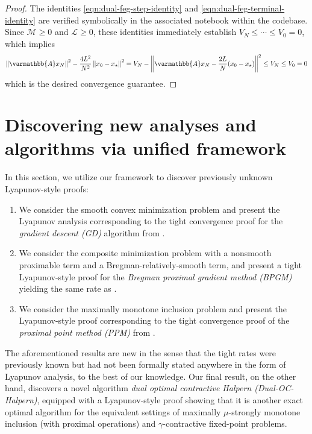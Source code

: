 \documentclass{article}
\theoremstyle{definition}
\theoremstyle{plain}
\newcommand{\cL}{{\mathcal{L}}}
\newcommand{\cM}{{\mathcal{M}}}
\newcommand{\opA}{{\varmathbb{A}}}
\newcommand{\sqnorm}[1]{\left\| #1 \right\|^2}
\begin{document}
\begin{proof}
The identities \eqref{eqn:dual-feg-step-identity} and \eqref{eqn:dual-feg-terminal-identity} are verified symbolically in the associated notebook  within the codebase.
Since $\cM\ge0$ and $\cL\ge0$, these identities immediately establish $V_N\le\cdots\le V_0=0$, which implies
\begin{align*}
    \sqnorm{\opA x_N}
    -\frac{4L^2}{N^2}\sqnorm{x_0-x_\star}
    =
    V_N-\sqnorm{\opA x_N-\frac{2L}{N}(x_0-x_\star)} 
    \le V_N \le V_0 = 0 
\end{align*}
which is the desired convergence guarantee.
\end{proof}




\section{Discovering new analyses and algorithms via unified framework}
\label{section:new-lyapunov}

In this section, we utilize our framework to discover previously unknown Lyapunov-style proofs:
\begin{enumerate}
    \item We consider the smooth convex minimization problem and present the Lyapunov analysis corresponding to the tight convergence proof for the \emph{gradient descent (GD)} algorithm from \cite{DroriTeboulle2014_performance}.
    
    \item We consider the composite minimization problem with a nonsmooth proximable term and a Bregman-relatively-smooth term, and present a tight Lyapunov-style proof for the \emph{Bregman proximal gradient method (BPGM)} yielding the same rate as \cite{ZhouLiangShen2019_simple, GutmanPena2023_perturbed}.
    
    \item We consider the maximally monotone inclusion problem and present the Lyapunov-style proof corresponding to the tight convergence proof of the \emph{proximal point method (PPM)} from \cite{guTightSublinearConvergence2020}.
\end{enumerate}
The aforementioned results are new in the sense that the tight rates were previously known but had not been formally stated anywhere in the form of Lyapunov analysis, to the best of our knowledge.
Our final result, on the other hand, discovers a novel algorithm \emph{dual optimal contractive Halpern (Dual-OC-Halpern)}, equipped with a Lyapunov-style proof showing that it is another exact optimal algorithm for the equivalent settings of maximally $\mu$-strongly monotone inclusion (with proximal operations) and $\gamma$-contractive fixed-point problems.
\end{document}
